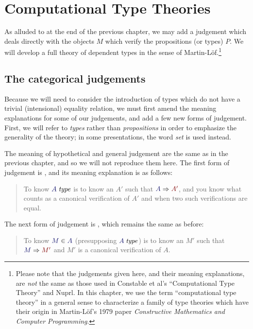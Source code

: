 \documentclass[main.tex]{subfiles}
\begin{document}
\onehalfspacing

\chapter{Computational Type Theories}

As alluded to at the end of the previous chapter, we may add a judgement
 which deals directly with the objects $M$ which verify the
propositions (or types) $P$. We will develop a full theory of dependent types
in the sense of Martin-L\"of.\footnote{Please note that the judgements given here, and
their meaning explanations, are \emph{not} the same as those used in Constable
et al's ``Computational Type Theory'' and Nuprl. In this chapter, we use the
term ``computational type theory'' in a general sense to characterize a family
of type theories which have their origin in Martin-L\"of's 1979 paper
\emph{Constructive Mathematics and Computer Programming}.}

\section{The categorical judgements}

Because we will need to consider the introduction of types which do not have a
trivial (intensional) equality relation, we must first amend the meaning
explanations for some of our judgements, and add a few new forms of judgement.
First, we will refer to \emph{types} rather than \emph{propositions} in order
to emphasize the generality of the theory; in some presentations, the word
\emph{set} is used instead.

The meaning of hypothetical and general judgement are the same as in
the previous chapter, and so we will not reproduce them here. The
first form of judgement is , and its meaning
explanation is as follows:

\begin{quote}
  To know $\isset{A}$ is to know an $A'$ such that $\reduce{A}{A'}$,
  and you know what counts as a canonical verification of $A'$ and when
  two such verifications are equal.
\end{quote}

The next form of judgement is , which remains
the same as before:

\begin{quote}
  To know $\ver{M}{A}$ (presupposing $\isset{A}$) is to know an $M'$ such that
  $\reduce{M}{M'}$ and $M'$ is a canonical verification of $A$.
\end{quote}
\end{document}
